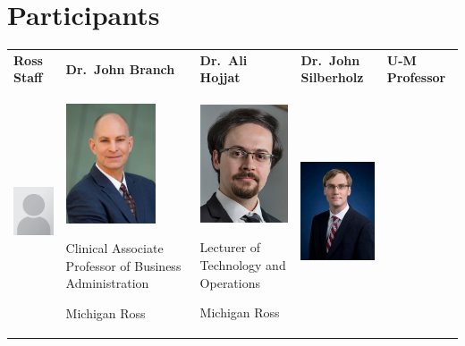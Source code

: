 \documentclass[
]{book}
\begin{document}
\hypertarget{participants}{%
\section{Participants}\label{participants}}

\begin{longtable}[]{@{}
  >{\centering\arraybackslash}p{}
  >{\centering\arraybackslash}p{}
  >{\centering\arraybackslash}p{}
  >{\centering\arraybackslash}p{}
  >{\centering\arraybackslash}p{}@{}}
\toprule\noalign{}
\endhead
\bottomrule\noalign{}
\endlastfoot
\textbf{Ross Staff} & \textbf{Dr.~John Branch} & \textbf{Dr.~Ali Hojjat} & \textbf{Dr.~John Silberholz} & \textbf{U-M Professor} \\
\includegraphics[width=1.04167in,height=\textheight]{plc.png} & \includegraphics[width=1.04167in,height=\textheight]{branch.jpeg}

Clinical Associate Professor of Business Administration

Michigan Ross & \includegraphics[width=1.04167in,height=\textheight]{hojjat.jpeg}

Lecturer of Technology and Operations

Michigan Ross & \includegraphics[width=1.04167in,height=\textheight]{silverholtz.jpeg}


\end{longtable}
\end{document}
